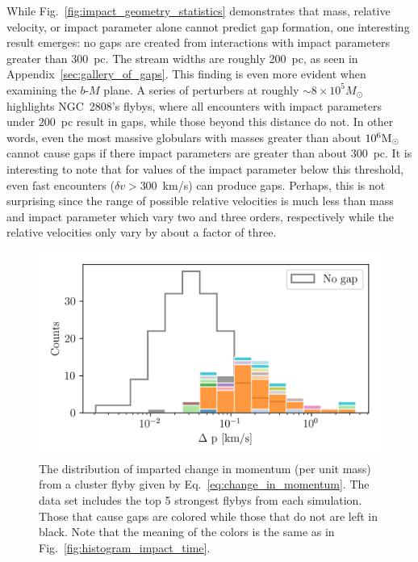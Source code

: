 \documentclass[draft]{aa}
\begin{document}
      
  
    While Fig.~\ref{fig:impact_geometry_statistics} demonstrates that mass, relative velocity, or impact parameter alone cannot predict gap formation, one interesting result emerges: no gaps are created from interactions with impact parameters greater than 300~pc. The stream widths are roughly 200~pc, as seen in Appendix~\ref{sec:gallery_of_gaps}. This finding is even more evident when examining the $b$-$M$ plane. A series of perturbers at roughly $\sim8 \times 10^5 M_\odot$ highlights NGC~2808's flybys, where all encounters with impact parameters under 200~pc result in gaps, while those beyond this distance do not. In other words, even the most massive globulars with masses greater than about $10^6 \rm{M}_\odot$ cannot cause gaps if there impact parameters are greater than about $300$~pc. It is interesting to note that for values of the impact parameter below this threshold, even fast encounters ($\delta v > 300$~km/s) can produce gaps. Perhaps, this is not surprising since the range of possible relative velocities is much less than mass and impact parameter which vary two and three orders, respectively while the relative velocities only vary by about a factor of three.

    \begin{figure}
      \centering
      \includegraphics[width=1\linewidth]{impact_geometry_statistics_deltaP.png}
      \caption{The distribution of imparted  change in momentum (per unit mass) from a cluster flyby given by Eq.~\ref{eq:change_in_momentum}. The data set includes the top 5 strongest flybys from each simulation. Those that cause gaps are colored while those that do not are left in black. Note that the meaning of the colors is the same as in Fig.~\ref{fig:histogram_impact_time}.}
      \label{fig:deltap}
    \end{figure}
      
\end{document}
